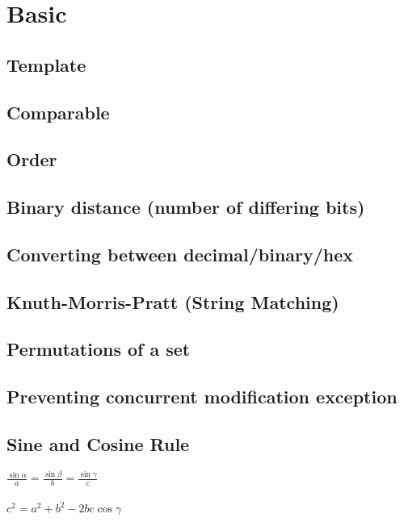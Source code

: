 \documentclass{article}
\begin{document}
\tableofcontents
\newpage

\section{Basic}
	\subsection{Template}
    \noindent\fbox{%
    \parbox{\textwidth}{
	
	}}
    
	\subsection{Comparable}
	

	\newpage
	\subsection{Order}
	

	\subsection{Binary distance (number of differing bits)}
	

	\subsection{Converting between decimal/binary/hex}
	

	\subsection{Knuth-Morris-Pratt (String Matching)}
	

	\newpage
	\subsection{Permutations of a set}
	

	\subsection{Preventing concurrent modification exception}
    

	\subsection{Sine and Cosine Rule}
	$\frac{\sin{\alpha}}{a} = \frac{\sin{\beta}}{b} = \frac{\sin{\gamma}}{c}$
	\\
	\\
	$c^2 = a^2 + b^2 - 2bc \cos{\gamma}$
\end{document}
